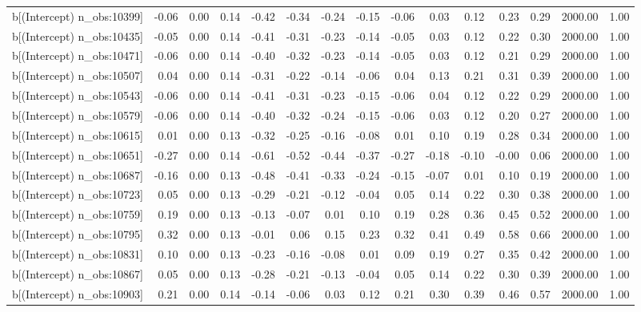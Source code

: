 \begin{table}[ht]
\begin{tabular}{rrrrrrrrrrrrrrr}
  b[(Intercept) n\_obs:10399] & -0.06 & 0.00 & 0.14 & -0.42 & -0.34 & -0.24 & -0.15 & -0.06 & 0.03 & 0.12 & 0.23 & 0.29 & 2000.00 & 1.00 \\ 
  b[(Intercept) n\_obs:10435] & -0.05 & 0.00 & 0.14 & -0.41 & -0.31 & -0.23 & -0.14 & -0.05 & 0.03 & 0.12 & 0.22 & 0.30 & 2000.00 & 1.00 \\ 
  b[(Intercept) n\_obs:10471] & -0.06 & 0.00 & 0.14 & -0.40 & -0.32 & -0.23 & -0.14 & -0.05 & 0.03 & 0.12 & 0.21 & 0.29 & 2000.00 & 1.00 \\ 
  b[(Intercept) n\_obs:10507] & 0.04 & 0.00 & 0.14 & -0.31 & -0.22 & -0.14 & -0.06 & 0.04 & 0.13 & 0.21 & 0.31 & 0.39 & 2000.00 & 1.00 \\ 
  b[(Intercept) n\_obs:10543] & -0.06 & 0.00 & 0.14 & -0.41 & -0.31 & -0.23 & -0.15 & -0.06 & 0.04 & 0.12 & 0.22 & 0.29 & 2000.00 & 1.00 \\ 
  b[(Intercept) n\_obs:10579] & -0.06 & 0.00 & 0.14 & -0.40 & -0.32 & -0.24 & -0.15 & -0.06 & 0.03 & 0.12 & 0.20 & 0.27 & 2000.00 & 1.00 \\ 
  b[(Intercept) n\_obs:10615] & 0.01 & 0.00 & 0.13 & -0.32 & -0.25 & -0.16 & -0.08 & 0.01 & 0.10 & 0.19 & 0.28 & 0.34 & 2000.00 & 1.00 \\ 
  b[(Intercept) n\_obs:10651] & -0.27 & 0.00 & 0.14 & -0.61 & -0.52 & -0.44 & -0.37 & -0.27 & -0.18 & -0.10 & -0.00 & 0.06 & 2000.00 & 1.00 \\ 
  b[(Intercept) n\_obs:10687] & -0.16 & 0.00 & 0.13 & -0.48 & -0.41 & -0.33 & -0.24 & -0.15 & -0.07 & 0.01 & 0.10 & 0.19 & 2000.00 & 1.00 \\ 
  b[(Intercept) n\_obs:10723] & 0.05 & 0.00 & 0.13 & -0.29 & -0.21 & -0.12 & -0.04 & 0.05 & 0.14 & 0.22 & 0.30 & 0.38 & 2000.00 & 1.00 \\ 
  b[(Intercept) n\_obs:10759] & 0.19 & 0.00 & 0.13 & -0.13 & -0.07 & 0.01 & 0.10 & 0.19 & 0.28 & 0.36 & 0.45 & 0.52 & 2000.00 & 1.00 \\ 
  b[(Intercept) n\_obs:10795] & 0.32 & 0.00 & 0.13 & -0.01 & 0.06 & 0.15 & 0.23 & 0.32 & 0.41 & 0.49 & 0.58 & 0.66 & 2000.00 & 1.00 \\ 
  b[(Intercept) n\_obs:10831] & 0.10 & 0.00 & 0.13 & -0.23 & -0.16 & -0.08 & 0.01 & 0.09 & 0.19 & 0.27 & 0.35 & 0.42 & 2000.00 & 1.00 \\ 
  b[(Intercept) n\_obs:10867] & 0.05 & 0.00 & 0.13 & -0.28 & -0.21 & -0.13 & -0.04 & 0.05 & 0.14 & 0.22 & 0.30 & 0.39 & 2000.00 & 1.00 \\ 
  b[(Intercept) n\_obs:10903] & 0.21 & 0.00 & 0.14 & -0.14 & -0.06 & 0.03 & 0.12 & 0.21 & 0.30 & 0.39 & 0.46 & 0.57 & 2000.00 & 1.00 \\ 

\end{tabular}
\end{table}
